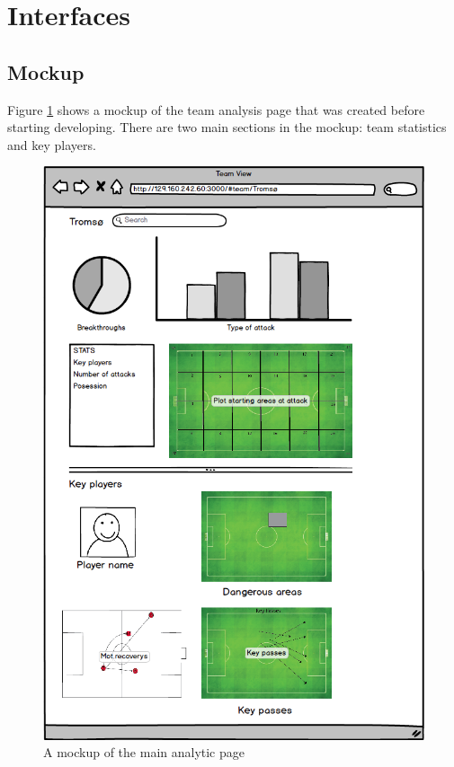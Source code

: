\section{Interfaces}

\subsection{Mockup}

Figure \ref{fig:mockup} shows a mockup of the team analysis page that was created before starting developing. There are two main sections in the mockup: team statistics and key players.

\begin{figure}[ht!]
\centering
\includegraphics[width=1\textwidth]{images/general/mockup.png}
\caption{A mockup of the main analytic page}
\label{fig:mockup}
\end{figure}

